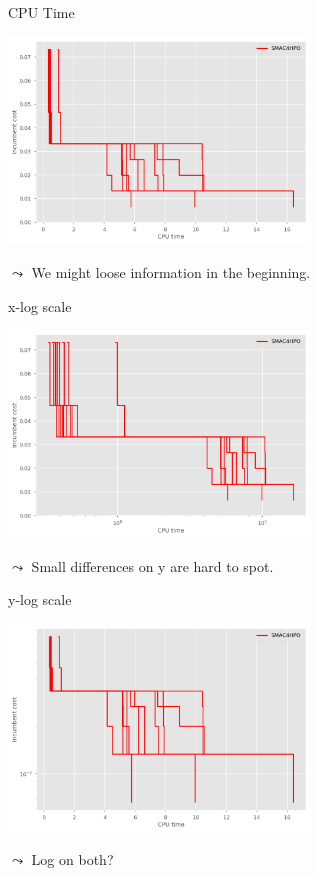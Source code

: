 	
\begin{frame}[c]{CPU Time}
	
	\centering
	\includegraphics[width=0.6\textwidth]{plots/cpu_time/5_smac4hpo_step.png}
	
	\pause
	$\leadsto$ We might loose information in the beginning.
	
\end{frame}


\begin{frame}[c]{x-log scale}
	
	\centering
	\includegraphics[width=0.6\textwidth]{plots/cpu_time/6_1_smac4hpo_step_log_x.png}
	
	\pause
	$\leadsto$ Small differences on y are hard to spot.
	
\end{frame}


\begin{frame}[c]{y-log scale}
	
	\centering
	\includegraphics[width=0.6\textwidth]{plots/cpu_time/6_2_smac4hpo_step_log_y.png}
	
	\pause
	$\leadsto$ Log on both?
	
\end{frame}

